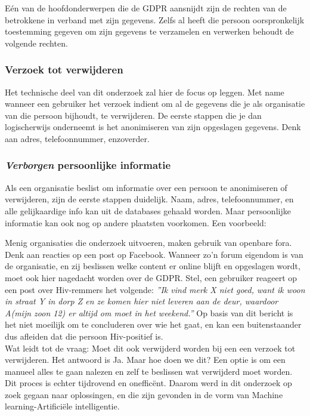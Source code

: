 Eén van de hoofdonderwerpen die de GDPR aansnijdt zijn de rechten van de betrokkene in verband met zijn gegevens. Zelfs al heeft die persoon oorspronkelijk toestemming gegeven om zijn gegevens te verzamelen en verwerken behoudt de volgende rechten.

\subsubsection{Verzoek tot verwijderen}
Het technische deel van dit onderzoek zal hier de focus op leggen. Met name wanneer een gebruiker het verzoek indient om al de gegevens die je als organisatie van die persoon bijhoudt, te verwijderen. De eerste stappen die je dan logischerwijs onderneemt is het anonimiseren van zijn opgeslagen gegevens. Denk aan adres, telefoonnummer, enzoverder. 

\subsubsection{\textit{Verborgen} persoonlijke informatie}
Als een organisatie beslist om informatie over een persoon te anonimiseren of verwijderen, zijn de eerste stappen duidelijk. Naam, adres, telefoonnummer, en alle gelijkaardige info kan uit de databases gehaald worden. 
Maar persoonlijke informatie kan ook nog op andere plaatsten voorkomen. Een voorbeeld: 

Menig organisaties die onderzoek uitvoeren, maken gebruik van openbare fora. Denk aan reacties op een post op Facebook. Wanneer zo'n forum eigendom is van de organisatie, en zij beslissen welke content er online blijft en opgeslagen wordt, moet ook hier nagedacht worden over de GDPR. Stel, een gebruiker reageert op een post over Hiv-remmers het volgende: \textit{”Ik vind merk X niet goed, want ik woon in straat Y in dorp Z en ze komen hier niet leveren aan de deur, waardoor A(mijn zoon 12) er altijd om moet in het weekend.”}
Op basis van dit bericht is het niet moeilijk om te concluderen over wie het gaat, en kan een buitenstaander dus afleiden dat die persoon Hiv-positief is. \\ Wat leidt tot de vraag: Moet dit ook verwijderd worden bij een een verzoek tot verwijderen. Het antwoord is Ja. Maar hoe doen we dit? Een optie is om een manueel alles te gaan nalezen en zelf te beslissen wat verwijderd moet worden. Dit proces is echter tijdrovend en onefficënt. Daarom werd in dit onderzoek op zoek gegaan naar oplossingen, en die zijn gevonden in de vorm van Machine learning-Artificiële intelligentie. 

